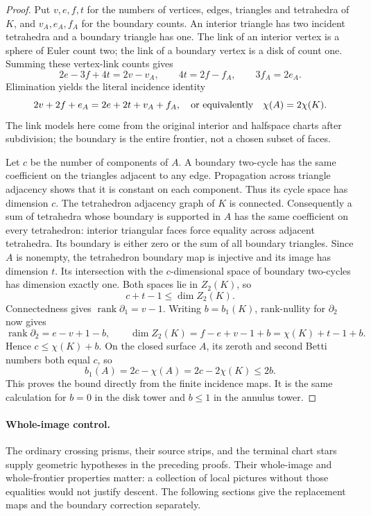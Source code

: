 \begin{proof}
Put $v,e,f,t$ for the numbers of vertices, edges, triangles and
tetrahedra of $K$, and $v_A,e_A,f_A$ for the boundary counts.
An interior triangle has two incident tetrahedra and a boundary
triangle has one.  The link of an interior vertex is a sphere of
Euler count two; the link of a boundary vertex is a disk of count
one.  Summing these vertex-link counts gives
\[
 2e-3f+4t=2v-v_A,
 \qquad 4t=2f-f_A,
 \qquad 3f_A=2e_A.
\]
Elimination yields the literal incidence identity
\[
 2v+2f+e_A=2e+2t+v_A+f_A,
 \quad\hbox{or equivalently}\quad \chi(A)=2\chi(K).
\]
The link models here come from the original interior and halfspace
charts after subdivision; the boundary is the entire frontier,
not a chosen subset of faces.

Let $c$ be the number of components of $A$.  A boundary two-cycle
has the same coefficient on the triangles adjacent to any edge.
Propagation across triangle adjacency shows that it is constant
on each component.  Thus its cycle space has dimension $c$.
The tetrahedron adjacency graph of $K$ is connected.  Consequently
a sum of tetrahedra whose boundary is supported in $A$ has the
same coefficient on every tetrahedron: interior triangular faces
force equality across adjacent tetrahedra.  Its boundary is either
zero or the sum of all boundary triangles.  Since $A$ is nonempty,
the tetrahedron boundary map is injective and its image has dimension
$t$.  Its intersection with the $c$-dimensional space of boundary
two-cycles has dimension exactly one.  Both spaces lie in $Z_2(K)$,
so
\[
                       c+t-1\leq\dim Z_2(K).
\]
Connectedness gives $\operatorname{rank}\partial_1=v-1$.
Writing $b=b_1(K)$, rank-nullity for $\partial_2$ now gives
\[
 \operatorname{rank}\partial_2=e-v+1-b,
 \qquad \dim Z_2(K)=f-e+v-1+b=\chi(K)+t-1+b.
\]
Hence $c\leq\chi(K)+b$.  On the closed surface $A$, its zeroth
and second Betti numbers both equal $c$, so
\[
 b_1(A)=2c-\chi(A)=2c-2\chi(K)\leq2b.
\]
This proves the bound directly from the finite incidence maps.
It is the same calculation for $b=0$ in the disk tower and $b\leq1$
in the annulus tower.
\end{proof}

\paragraph{Whole-image control.}
\label{rem:dehn-local-review}
The ordinary crossing prisms, their source strips, and the terminal
chart stars supply geometric hypotheses in the preceding proofs.
Their whole-image and whole-frontier properties matter: a collection
of local pictures without those equalities would not justify descent.
The following sections give the
replacement maps and the boundary correction separately.

